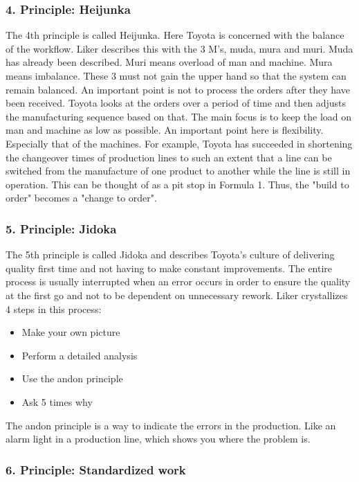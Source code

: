\documentclass[a4paper,11pt]{article}
\begin{document}
\subsubsection*{4. Principle: Heijunka}

The 4th principle is called Heijunka. Here Toyota is concerned with the
balance of the workflow. Liker describes this with the 3 M's, muda, mura and
muri. Muda has already been described. Muri means overload of man and
machine. Mura means imbalance. These 3 must not gain the upper hand so that
the system can remain balanced. An important point is not to process the
orders after they have been received. Toyota looks at the orders over a period
of time and then adjusts the manufacturing sequence based on that. The main
focus is to keep the load on man and machine as low as possible. An important
point here is flexibility. Especially that of the machines. For example,
Toyota has succeeded in shortening the changeover times of production lines to
such an extent that a line can be switched from the manufacture of one product
to another while the line is still in operation. This can be thought of as a
pit stop in Formula 1. Thus, the "build to order" becomes a "change to order".

\subsubsection*{5. Principle: Jidoka}

The 5th principle is called Jidoka and describes Toyota's culture of
delivering quality first time and not having to make constant
improvements. The entire process is usually interrupted when an error occurs
in order to ensure the quality at the first go and not to be dependent on
unnecessary rework. Liker crystallizes 4 steps in this process:

\begin{itemize}
\item Make your own picture
\item Perform a detailed analysis
\item Use the andon principle 
\item Ask 5 times why
\end{itemize}

The andon principle is a way to indicate the errors in the production. Like an
alarm light in a production line, which shows you where the problem is.

\subsubsection*{6. Principle: Standardized work}
\end{document}
